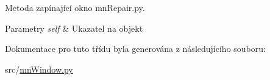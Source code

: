 Metoda zapínající okno mn\-Repair.\-py. 


\begin{DoxyParams}{Parametry}
{\em self} & Ukazatel na objekt \\
\hline
\end{DoxyParams}


Dokumentace pro tuto třídu byla generována z následujícího souboru\-:\begin{DoxyCompactItemize}
\item 
src/\hyperlink{mnWindow_8py}{mn\-Window.\-py}\end{DoxyCompactItemize}

